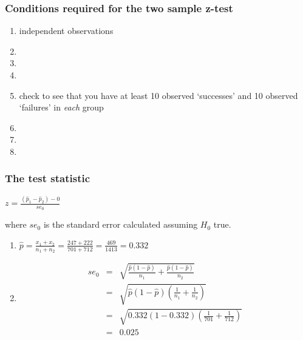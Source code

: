 \begin{frame}
\frametitle{Conditions required for the two sample z-test}
\begin{enumerate}
    \item
    independent observations
    \item[]
    \item[]
    \item[]
    \item
    check to see that you have at least 10 observed `successes' and 10 observed `failures' in \emph{each} group
    \item[]
    \item[]
    \item[]
\end{enumerate}
\end{frame}

\begin{frame}
\frametitle{The test statistic}
\begin{center}
$\displaystyle z=\frac{(\hat{p}_1-\hat{p}_2)-0}{se_0}$
\end{center}
\vskip5pt
where $se_0$ is the standard error calculated assuming $H_0$ true.
\vskip5pt
\begin{enumerate}
    \item
    $\displaystyle\hat{p}=\frac{x_1 + x_2}{n_1 + n_2}=\frac{247+222}{701+712}=\frac{469}{1413}=0.332$
    \item
    \small{
    \begin{eqnarray*}
    se_0 &=& \sqrt{\frac{\hat{p}(1-\hat{p})}{n_1}+\frac{\hat{p}(1-\hat{p})}{n_2}} \\
         &=& \sqrt{\hat{p}(1-\hat{p})\left(\frac{1}{n_1}+\frac{1}{n_2}\right)}\\
         &=&\sqrt{0.332(1-0.332)\left(\frac{1}{701}+\frac{1}{712}\right)} \\
         &=& 0.025
    \end{eqnarray*}}
\end{enumerate}
\end{frame}

